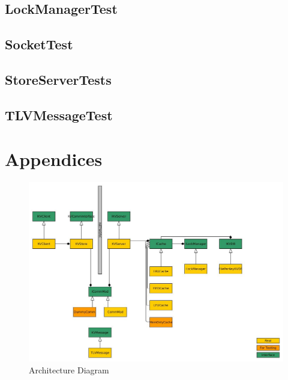 \documentclass[12pt]{article}
\begin{document}
\begin{multicols}{2}
\subsection{LockManagerTest}

\subsection{SocketTest}

\subsection{StoreServerTests}

\subsection{TLVMessageTest}

\end{multicols}

\newpage

\section{Appendices}

\begin{figure}[H]
\centering
\includegraphics[scale=0.50]{architecture}
\caption{Architecture Diagram}
\label{arch}
\end{figure}
\end{document}
